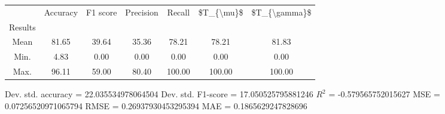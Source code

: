 \begin{tabular}{|c|c|c|c|c|c|c|}
\toprule
{} &  Accuracy &  F1 score &  Precision &  Recall &  \$T\_\{\textbackslash mu\}\$ &  \$T\_\{\textbackslash gamma\}\$ \\
Results &           &           &            &         &            &               \\
\hline
Mean    &     81.65 &     39.64 &      35.36 &   78.21 &      78.21 &         81.83 \\
Min.    &      4.83 &      0.00 &       0.00 &    0.00 &       0.00 &          0.00 \\
Max.    &     96.11 &     59.00 &      80.40 &  100.00 &     100.00 &        100.00 \\
\bottomrule
\end{tabular}

 Dev. std. accuracy = 22.035534978064504
 Dev. std. F1-score = 17.050525795881246
 $R^2$ = -0.579565752015627
 MSE = 0.07256520971065794
 RMSE = 0.26937930453295394
 MAE = 0.1865629247828696
